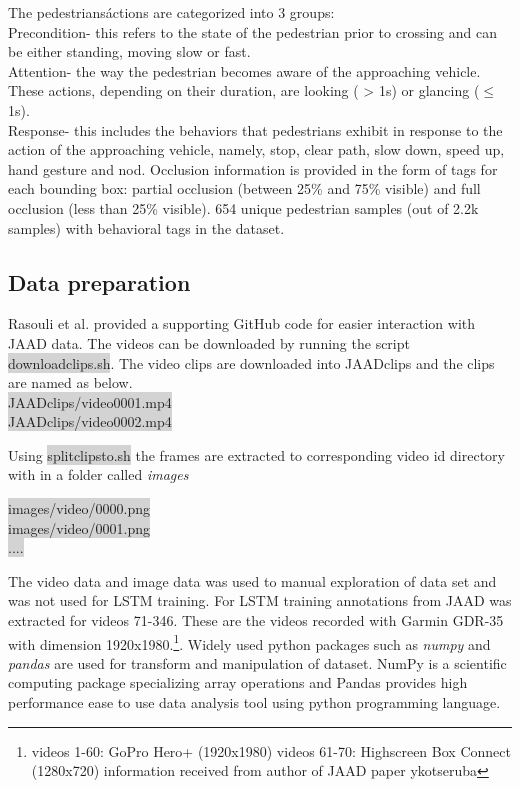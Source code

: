 The pedestrians\' actions are categorized into 3 groups: \\
Precondition- this refers to the state of the pedestrian prior to crossing and can be either standing, moving slow or fast. \\
Attention- the way the pedestrian becomes aware of the approaching vehicle. These actions, depending on their duration, are looking ( > 1s) or glancing ($\leq$ 1s). \\
Response- this includes the behaviors that pedestrians exhibit in response
to the action of the approaching vehicle, namely, stop, clear path, slow down, speed up, hand gesture and nod.
Occlusion information is provided in the form of tags for each bounding box: partial occlusion (between 25\% and 75\% visible) and full occlusion (less than 25\% visible).  654 unique pedestrian samples (out of 2.2k samples) with behavioral tags in the dataset. 

\subsection{Data preparation}
\cite{rasouli2017agreeing} Rasouli et al. provided a supporting GitHub code for easier interaction with JAAD data. The videos can be downloaded by running the script \colorbox{lightgray}{download\textunderscore clips.sh}. The video clips are downloaded into JAAD\textunderscore clips and the clips are named as below.\\
\colorbox{lightgray} {JAAD\textunderscore clips/video\textunderscore  0001.mp4} \\
\colorbox{lightgray} {JAAD\textunderscore clips/video\textunderscore  0002.mp4}

Using \colorbox{lightgray}{split\textunderscore clips\textunderscore to\textunderscore .sh} the frames are extracted to corresponding video id directory with in a folder called \textit{images} \\
\begin{center}
\colorbox{lightgray} {images/video/0000.png} \\
\colorbox{lightgray} {images/video/0001.png} \\
\colorbox{lightgray} {....}
\end{center}

The video data and image data was used to manual exploration of data set and was not used for LSTM training. For LSTM training annotations from JAAD was extracted for videos 71-346. These are the videos recorded with Garmin GDR-35 with dimension 1920x1980.\footnote{videos 1-60: GoPro Hero+ (1920x1980)
videos 61-70: Highscreen Box Connect (1280x720) information received from author of JAAD paper ykotseruba}. Widely used python packages such as \textit{numpy }and \textit{pandas} are used for transform and manipulation of dataset. NumPy is a scientific computing package specializing array operations and Pandas provides high performance ease to use data analysis tool using python programming language.  \\

